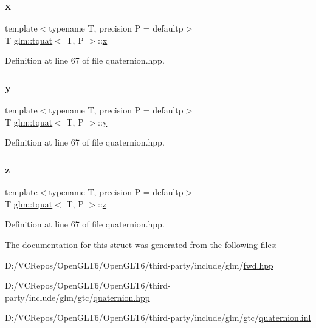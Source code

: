 \subsubsection{\texorpdfstring{x}{x}}
{\footnotesize\ttfamily template$<$typename T, precision P = defaultp$>$ \\
T \mbox{\hyperlink{structglm_1_1tquat}{glm\+::tquat}}$<$ T, P $>$\+::\mbox{\hyperlink{glad_8h_a92d0386e5c19fb81ea88c9f99644ab1d}{x}}}



Definition at line 67 of file quaternion.\+hpp.

\mbox{\label{structglm_1_1tquat_a06d5c5fb3b08ec993fb4dd74b22fc011}} 
\subsubsection{\texorpdfstring{y}{y}}
{\footnotesize\ttfamily template$<$typename T, precision P = defaultp$>$ \\
T \mbox{\hyperlink{structglm_1_1tquat}{glm\+::tquat}}$<$ T, P $>$\+::\mbox{\hyperlink{glad_8h_a66ddd433d2cacfe27f5906b7e86faeed}{y}}}



Definition at line 67 of file quaternion.\+hpp.

\mbox{\label{structglm_1_1tquat_a1b28678ac0e0b3ac2537059754df9fdf}} 
\subsubsection{\texorpdfstring{z}{z}}
{\footnotesize\ttfamily template$<$typename T, precision P = defaultp$>$ \\
T \mbox{\hyperlink{structglm_1_1tquat}{glm\+::tquat}}$<$ T, P $>$\+::\mbox{\hyperlink{glad_8h_acb78bf1972d3eaf07da34ff2e0a2f133}{z}}}



Definition at line 67 of file quaternion.\+hpp.



The documentation for this struct was generated from the following files\+:\begin{DoxyCompactItemize}
\item 
D\+:/\+V\+C\+Repos/\+Open\+G\+L\+T6/\+Open\+G\+L\+T6/third-\/party/include/glm/\mbox{\hyperlink{fwd_8hpp}{fwd.\+hpp}}\item 
D\+:/\+V\+C\+Repos/\+Open\+G\+L\+T6/\+Open\+G\+L\+T6/third-\/party/include/glm/gtc/\mbox{\hyperlink{gtc_2quaternion_8hpp}{quaternion.\+hpp}}\item 
D\+:/\+V\+C\+Repos/\+Open\+G\+L\+T6/\+Open\+G\+L\+T6/third-\/party/include/glm/gtc/\mbox{\hyperlink{gtc_2quaternion_8inl}{quaternion.\+inl}}\end{DoxyCompactItemize}
